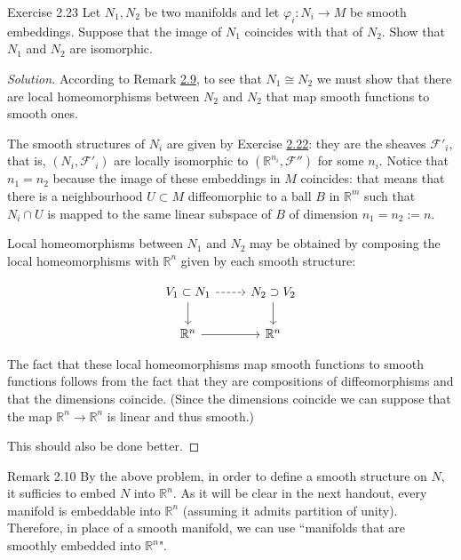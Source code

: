 \begin{thing4}{Exercise 2.23}\label{exer:2.23}\leavevmode
Let \(N_1,N_2\) be two manifolds and let \(\varphi_i:N_i\to M\) be smooth embeddings. Suppose that the image of \(N_1\) coincides with that of \(N_2\). Show that \(N_1\) and \(N_2\) are isomorphic.
\end{thing4}

\begin{proof}[Solution]\leavevmode
According to Remark \hyperref[rk:2.9]{2.9}, to see that \(N_1\cong N_2\) we must show that there are local homeomorphisms between \(N_2\) and \(N_2\) that map smooth functions to smooth ones.

The smooth structures of \(N_i\) are given by Exercise \hyperref[exer:2.22]{2.22}: they are the sheaves \(\mathcal{F}'_i\), that is, \((N_i,\mathcal{F}'_i)\) are locally isomorphic to \((\mathbb{R}^{n_i},\mathcal{F}'')\) for some \(n_i\). Notice that \(n_1=n_2\) because the image of these embeddings in \(M\) coincides: that means that there is a neighbourhood \(U \subset M\) diffeomorphic to a ball \(B\) in \(\mathbb{R}^m\) such that \(N_i \cap U\) is mapped to the same linear subspace of \(B\) of dimension \(n_1=n_2:=n\).

Local homeomorphisms between \(N_1\) and \(N_2\) may be obtained by composing the local homeomorphisms with \(\mathbb{R}^{n}\) given by each smooth structure:

\[\begin{tikzcd}
	V_1 \subset N_1\arrow[r,dashed]\arrow[d]&N_2\supset V_2\arrow[d]\\
	\mathbb{R}^n\arrow[r]&\mathbb{R}^n
\end{tikzcd}\]


The fact that these local homeomorphisms map smooth functions to smooth functions follows from the fact that they are compositions of diffeomorphisms and that the dimensions coincide. (Since the dimensions coincide we can suppose that the map \(\mathbb{R}^{n}\to \mathbb{R}^{n}\) is linear and thus smooth.)

{\color{2}This should also be done better.}
\end{proof}
\begin{thing5}{Remark 2.10}\leavevmode
By the above problem, in order to define a smooth structure on $N$, it sufficies to embed $N$ into \(\mathbb{R}^n\). As it will be clear in the next handout, every manifold is embeddable into \(\mathbb{R}^n\) (assuming it admits partition of unity). Therefore, in place of a smooth manifold, we can use ``manifolds that are smoothly embedded into \(\mathbb{R}^n\)".
\end{thing5}


